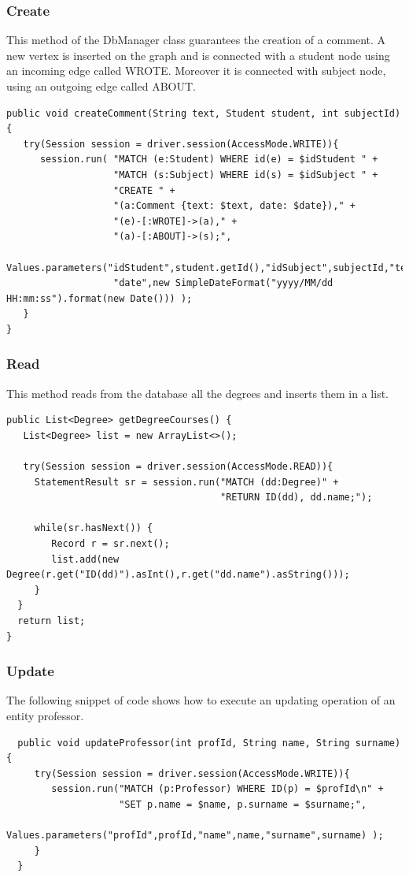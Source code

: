 \documentclass[a4paper]{article}
\begin{document}
\subsubsection{Create}
This method of the DbManager class guarantees the creation of a comment. A new vertex is inserted on the graph and  is connected with a student node using an incoming edge called WROTE. Moreover it is connected with subject node, using an outgoing edge called ABOUT.

\begin{verbatim}
public void createComment(String text, Student student, int subjectId) {
   try(Session session = driver.session(AccessMode.WRITE)){
      session.run( "MATCH (e:Student) WHERE id(e) = $idStudent " + 
                   "MATCH (s:Subject) WHERE id(s) = $idSubject " +
                   "CREATE " + 
                   "(a:Comment {text: $text, date: $date})," + 
                   "(e)-[:WROTE]->(a)," + 
                   "(a)-[:ABOUT]->(s);", 
             Values.parameters("idStudent",student.getId(),"idSubject",subjectId,"text",text,
                   "date",new SimpleDateFormat("yyyy/MM/dd HH:mm:ss").format(new Date())) );
   }
}
\end{verbatim}


\subsubsection{Read}
This method reads from the database all the degrees and inserts them in a list.

\begin{verbatim}
public List<Degree> getDegreeCourses() {
   List<Degree> list = new ArrayList<>();
 
   try(Session session = driver.session(AccessMode.READ)){
     StatementResult sr = session.run("MATCH (dd:Degree)" +
                                      "RETURN ID(dd), dd.name;");

     while(sr.hasNext()) {
        Record r = sr.next();
        list.add(new Degree(r.get("ID(dd)").asInt(),r.get("dd.name").asString()));
     }
  }
  return list;
}
\end{verbatim}


\subsubsection{Update}
The following snippet of code shows how to execute an updating operation of an entity professor.
\begin{verbatim}
  public void updateProfessor(int profId, String name, String surname) {
     try(Session session = driver.session(AccessMode.WRITE)){
        session.run("MATCH (p:Professor) WHERE ID(p) = $profId\n" + 
                    "SET p.name = $name, p.surname = $surname;",
        Values.parameters("profId",profId,"name",name,"surname",surname) );
     }
  }
\end{verbatim}
\end{document}
